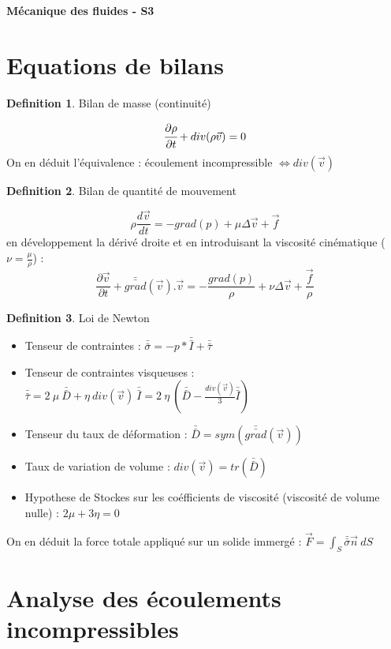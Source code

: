 \documentclass[french]{article}
\theoremstyle{definition}
\newtheorem{definition}{Definition}[section]
\begin{document}
\begin{center}
	\textbf{\Large{Mécanique des fluides - S3}}
\end{center}

\section{Equations de bilans}
\begin{definition}Bilan de masse (continuité)\par
$$ \cfrac{\partial \rho}{\partial t} + div(\rho \vec{v}) = 0 $$
	On en déduit l'équivalence : écoulement incompressible $ \Leftrightarrow div(\vec{v})$
\end{definition}

\begin{definition}Bilan de quantité de mouvement\par
	$$ \rho \frac{d \vec{v}}{dt} = -grad(p) + \mu \Delta\vec{v} + \vec{f} $$
	en développement la dérivé droite et en introduisant la viscosité cinématique ($\nu = \frac{\mu}{\rho}$) :
	$$ \frac{\partial \vec{v}}{\partial t} + \bar{\bar{grad}}(\vec{v}).\vec{v} = -\frac{grad(p)}{\rho} + \nu \Delta\vec{v} + \frac{\vec{f}}{\rho} $$
\end{definition}

\begin{definition}Loi de Newton\par
	\begin{itemize} 
		\item Tenseur de contraintes : $\bar{\bar{\sigma}} = -p* \bar{\bar{I}} + \bar{\bar{\tau}}$
		\item Tenseur de contraintes visqueuses : $ \bar{\bar{\tau}} = 2 \ \mu \ \bar{\bar{D}} + \eta \ div(\vec{v}) \ \bar{\bar{I}} = 2 \ \eta \ (\bar{\bar{D}} - \frac{div(\vec{v})}{3} \bar{\bar{I}}) $
		\item Tenseur du taux de déformation : $ \bar{\bar{D}} = sym(\bar{\bar{grad}}(\vec{v})) $
		\item Taux de variation de volume : $div(\vec{v}) = tr(\bar{\bar{D}})$
		\item Hypothese de Stockes sur les coéfficients de viscosité (viscosité de volume nulle) : $ 2 \mu + 3 \eta =0$
	\end{itemize}
	On en déduit la force totale appliqué sur un solide immergé : $ \vec{F} = \int_S \bar{\bar{\sigma}} \vec{n} \ dS $
\end{definition}

\section{Analyse des écoulements incompressibles}
\end{document}
